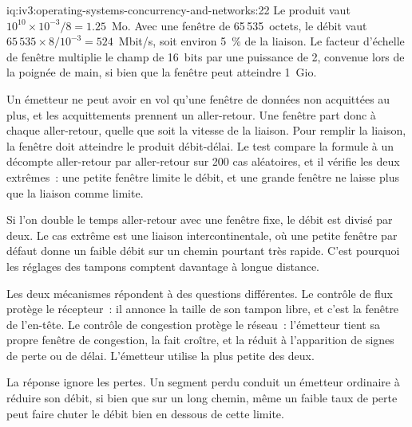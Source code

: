 \begin{solution}{iq:iv3:operating-systems-concurrency-and-networks:22}
Le produit vaut $10^{10} \times 10^{-3} / 8 = 1.25$~Mo. Avec une fenêtre de 65\,535~octets, le débit vaut $65\,535 \times 8 / 10^{-3} = 524$~Mbit/s, soit environ 5~\% de la liaison. Le facteur d'échelle de fenêtre multiplie le champ de 16~bits par une puissance de 2, convenue lors de la poignée de main, si bien que la fenêtre peut atteindre 1~Gio.
\label{lst:iv3:os:window}

Un émetteur ne peut avoir en vol qu'une fenêtre de données non acquittées au plus, et les acquittements prennent un aller-retour. Une fenêtre part donc à chaque aller-retour, quelle que soit la vitesse de la liaison. Pour remplir la liaison, la fenêtre doit atteindre le produit débit-délai. Le test compare la formule à un décompte aller-retour par aller-retour sur 200 cas aléatoires, et il vérifie les deux extrêmes~: une petite fenêtre limite le débit, et une grande fenêtre ne laisse plus que la liaison comme limite.

Si l'on double le temps aller-retour avec une fenêtre fixe, le débit est divisé par deux. Le cas extrême est une liaison intercontinentale, où une petite fenêtre par défaut donne un faible débit sur un chemin pourtant très rapide. C'est pourquoi les réglages des tampons comptent davantage à longue distance.

Les deux mécanismes répondent à des questions différentes. Le contrôle de flux protège le récepteur~: il annonce la taille de son tampon libre, et c'est la fenêtre de l'en-tête. Le contrôle de congestion protège le réseau~: l'émetteur tient sa propre fenêtre de congestion, la fait croître, et la réduit à l'apparition de signes de perte ou de délai. L'émetteur utilise la plus petite des deux.

La réponse ignore les pertes. Un segment perdu conduit un émetteur ordinaire à réduire son débit, si bien que sur un long chemin, même un faible taux de perte peut faire chuter le débit bien en dessous de cette limite.

\end{solution}

